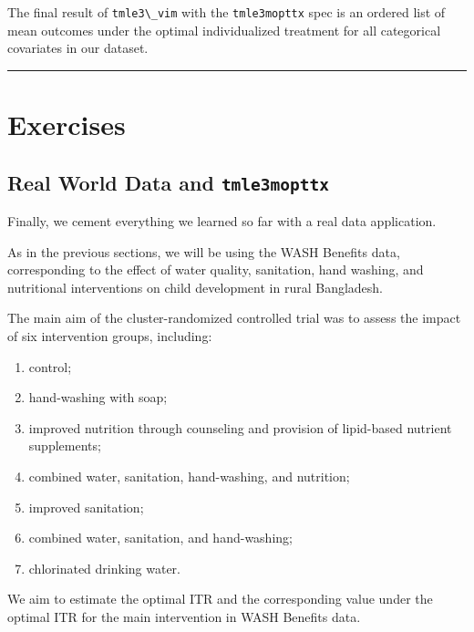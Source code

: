 \documentclass[
  12pt, krantz2,
]{krantz}
\newcommand{\passthrough}[1]{#1}
\newcommand{\1}{\mathbbm{1}}
\theoremstyle{definition}
\theoremstyle{definition}
\theoremstyle{definition}
\theoremstyle{definition}
\theoremstyle{remark}
\begin{document}
The final result of \passthrough{\lstinline!tmle3\_vim!} with the \passthrough{\lstinline!tmle3mopttx!} spec is an ordered list
of mean outcomes under the optimal individualized treatment for all categorical
covariates in our dataset.

\begin{center}\rule{0.5\linewidth}{0.5pt}\end{center}

\hypertarget{exercises-2}{%
\section{Exercises}\label{exercises-2}}

\hypertarget{real-world-data-and-tmle3mopttx}{%
\subsection{\texorpdfstring{Real World Data and \texttt{tmle3mopttx}}{Real World Data and tmle3mopttx}}\label{real-world-data-and-tmle3mopttx}}

Finally, we cement everything we learned so far with a real data application.

As in the previous sections, we will be using the WASH Benefits data,
corresponding to the effect of water quality, sanitation, hand washing, and
nutritional interventions on child development in rural Bangladesh.

The main aim of the cluster-randomized controlled trial was to assess the
impact of six intervention groups, including:

\begin{enumerate}
\def\labelenumi{\arabic{enumi}.}
\item
  control;
\item
  hand-washing with soap;
\item
  improved nutrition through counseling and provision of lipid-based nutrient
  supplements;
\item
  combined water, sanitation, hand-washing, and nutrition;
\item
  improved sanitation;
\item
  combined water, sanitation, and hand-washing;
\item
  chlorinated drinking water.
\end{enumerate}

We aim to estimate the optimal ITR and the corresponding value under the optimal
ITR for the main intervention in WASH Benefits data.
\end{document}
